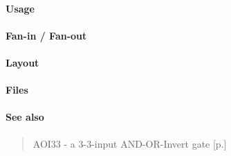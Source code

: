 \paragraph{Usage}

\paragraph{Fan-in / Fan-out}

\paragraph{Layout}

\paragraph{Files}

\paragraph{See also}
\begin{quote}
    AOI33 - a 3-3-input AND-OR-Invert gate [p.\pageref{AOI33}]
\end{quote}
